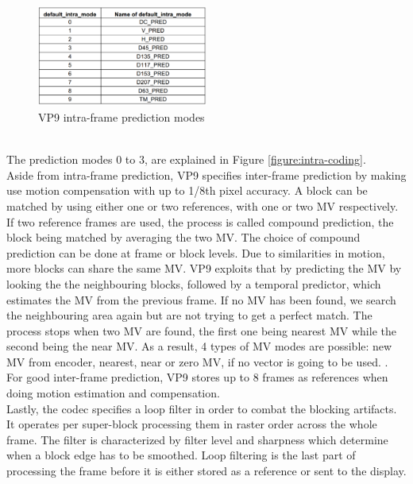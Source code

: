 \documentclass[a4paper,11pt,oneside]{article}
\begin{document}
\begin{figure}[h]
  \centering
  \includegraphics[width=0.5\textwidth]{../figures/intra-mods.pdf}
  \caption{VP9 intra-frame prediction modes \cite[pp.~71]{vp9_bitstream}}
  \label{figure:vp9_intra_modes}
\end{figure} \\
The prediction modes 0 to 3, are explained in Figure \ref{figure:intra-coding}. \\
Aside from intra-frame prediction, VP9 specifies inter-frame prediction by making use motion compensation with up to 1/8th pixel accuracy. A block can be matched by using either one or two references, with one or two MV respectively. If two reference frames are used, the process is called compound prediction, the block being matched by averaging the two MV. The choice of compound prediction can be done at frame or block levels. Due to similarities in motion, more blocks can share the same MV. VP9 exploits that by predicting the MV by looking the the neighbouring blocks, followed by a temporal predictor, which estimates the MV from the previous frame. If no MV has been found, we search the neighbouring area again but are not trying to get a perfect match. The process stops when two MV are found, the first one being nearest MV while the second being the near MV. As a result, 4 types of MV modes are possible: new MV from encoder, nearest, near or zero MV, if no vector is going to be used. \cite[pp.~20]{vp9_bitstream}. For good inter-frame prediction, VP9 stores up to 8 frames as references when doing motion estimation and compensation. \\
\indent Lastly, the codec specifies a loop filter in order to combat the blocking artifacts. It operates per super-block processing them in raster order across the whole frame. The filter is characterized by filter level and sharpness  which determine when a block edge has to be smoothed. Loop filtering is the last part of processing the frame before it is either stored as a reference or sent to the display.\\
\end{document}
